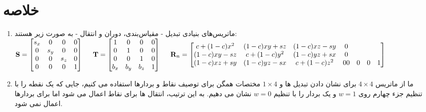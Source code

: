 \section{\textbf{خلاصه}}
\label{sec:3.6}
{
    \Large
    \begin{spacing}{1.5}
        \begin{enumerate}[label=\textbf{\arabic*}.]
            \item {ماتریس‌های بنیادی تبدیل - مقیاس‌بندی، دوران و انتقال - به صورت زیر هستند:
                $\textbf{S}=\begin{bmatrix}
                                s_x & 0   & 0   & 0 \\
                                0   & s_y & 0   & 0 \\
                                0   & 0   & s_z & 0 \\
                                0   & 0   & 0   & 1
                \end{bmatrix}\hspace{5 mm}\textbf{T}=\begin{bmatrix}
                                                         1     & 0     & 0     & 0 \\
                                                         0     & 1     & 0     & 0 \\
                                                         0     & 0     & 1     & 0 \\
                                                         b_{x} & b_{y} & b_{z} & 1
                \end{bmatrix}\hspace{5 mm}\textbf{R}_{n}=\begin{bmatrix}
                                                             c+(1-c)x^{2} & (1-c)xy+sz & (1-c)xz-sy & 0\\
                                                             (1-c)xy-sz & c+(1-c)y^{2} & (1-c)yz+sx & 0\\
                                                             (1-c)xz+sy & (1-c)yz-sx & c+(1-c)z^{2} & 0
                                                             0 & 0 & 0 & 1
                \end{bmatrix}$
            }

            \item {ما از ماتریس $4\times 4$ برای نشان دادن تبدیل ها و $1\times 4$ مختصات همگن برای توصیف نقاط و بردارها استفاده می کنیم،
            جایی که یک نقطه را با تنظیم جزء چهارم روی $w=1$ و یک بردار را با تنظیم $w=0$ نشان می دهیم.
            به این ترتیب، انتقال ها برای نقاط اعمال می شود اما برای بردارها اعمال نمی شود.}


\end{enumerate}
\end{spacing}}
